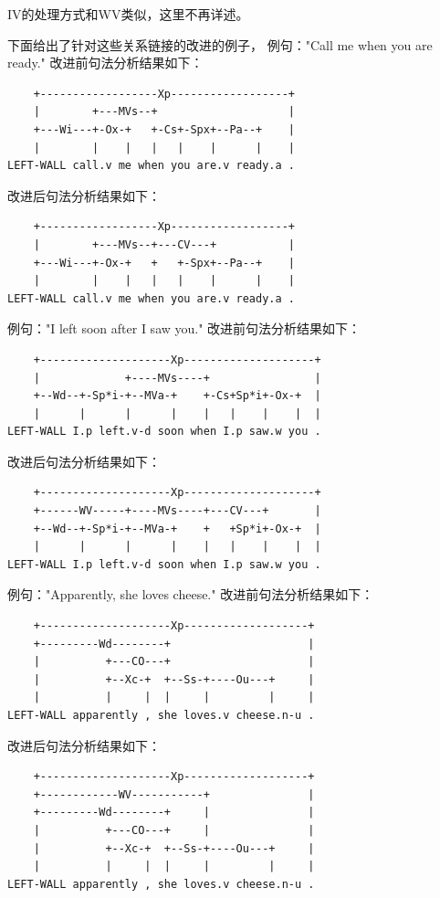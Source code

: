 IV的处理方式和WV类似，这里不再详述。

下面给出了针对这些关系链接的改进的例子，
例句："Call me when you are ready."
改进前句法分析结果如下：
\begin{verbatim}
    +------------------Xp------------------+
    |        +---MVs--+                    |
    +---Wi---+-Ox-+   +-Cs+-Spx+--Pa--+    |
    |        |    |   |   |    |      |    |
LEFT-WALL call.v me when you are.v ready.a .
\end{verbatim}

改进后句法分析结果如下：
\begin{verbatim}
    +------------------Xp------------------+
    |        +---MVs--+---CV---+           |
    +---Wi---+-Ox-+   +   +-Spx+--Pa--+    |
    |        |    |   |   |    |      |    |
LEFT-WALL call.v me when you are.v ready.a .
\end{verbatim}

例句："I left soon after I saw you."
改进前句法分析结果如下：
\begin{verbatim}
    +--------------------Xp--------------------+
    |             +----MVs----+                |
    +--Wd--+-Sp*i-+--MVa-+    +-Cs+Sp*i+-Ox-+  |
    |      |      |      |    |   |    |    |  |
LEFT-WALL I.p left.v-d soon when I.p saw.w you .
\end{verbatim}

改进后句法分析结果如下：
\begin{verbatim}
    +--------------------Xp--------------------+
    +------WV-----+----MVs----+---CV---+       |
    +--Wd--+-Sp*i-+--MVa-+    +   +Sp*i+-Ox-+  |
    |      |      |      |    |   |    |    |  |
LEFT-WALL I.p left.v-d soon when I.p saw.w you .
\end{verbatim}

例句："Apparently, she loves cheese."
改进前句法分析结果如下：
\begin{verbatim}
    +--------------------Xp-------------------+
    +---------Wd--------+                     |
    |          +---CO---+                     |
    |          +--Xc-+  +--Ss-+----Ou---+     |
    |          |     |  |     |         |     |
LEFT-WALL apparently , she loves.v cheese.n-u .
\end{verbatim}

改进后句法分析结果如下：

\begin{verbatim}
    +--------------------Xp-------------------+
    +------------WV-----------+               |
    +---------Wd--------+     |               |
    |          +---CO---+     |               |
    |          +--Xc-+  +--Ss-+----Ou---+     |
    |          |     |  |     |         |     |
LEFT-WALL apparently , she loves.v cheese.n-u .
\end{verbatim}

